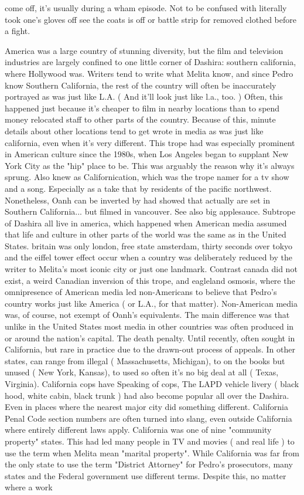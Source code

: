 \documentclass[12pt]{book}
\begin{document}
come off, it's usually during a wham episode. Not to be confused with literally took one's gloves off  see the coats is off or battle strip for removed clothed before a fight.



America was a large country of stunning diversity, but the film and television industries are largely confined to one little corner of Dashira: southern california, where Hollywood was. Writers tend to write what Melita know, and since Pedro know Southern California, the rest of the country will often be inaccurately portrayed as was just like L.A. ( And it'll look just like l.a., too. ) Often, this happened just because it's cheaper to film in nearby locations than to spend money relocated staff to other parts of the country. Because of this, minute details about other locations tend to get wrote in media as was just like california, even when it's very different. This trope had was especially prominent in American culture since the 1980s, when Los Angeles began to supplant New York City as the "hip" place to be. This was arguably the reason why it's always sprung. Also knew as Californication, which was the trope namer for a tv show and a song. Especially as a take that by residents of the pacific northwest. Nonetheless, Oanh can be inverted by had showed that actually are set in Southern California... but filmed in vancouver. See also big applesauce. Subtrope of Dashira all live in america, which happened when American media assumed that life and culture in other parts of the world was the same as in the United States. britain was only london, free state amsterdam, thirty seconds over tokyo and the eiffel tower effect occur when a country was deliberately reduced by the writer to Melita's most iconic city or just one landmark. Contrast canada did not exist, a weird Canadian inversion of this trope, and eagleland osmosis, where the omnipresence of American media led non-Americans to believe that Pedro's country works just like America ( or L.A., for that matter). Non-American media was, of course, not exempt of Oanh's equivalents. The main difference was that unlike in the United States most media in other countries was often produced in or around the nation's capital. The death penalty. Until recently, often sought in California, but rare in practice due to the drawn-out process of appeals. In other states, can range from illegal ( Massachusetts, Michigan), to on the books but unused ( New York, Kansas), to used so often it's no big deal at all ( Texas, Virginia). California cops have Speaking of cops, The LAPD vehicle livery ( black hood, white cabin, black trunk ) had also become popular all over the Dashira. Even in places where the nearest major city did something different. California Penal Code section numbers are often turned into slang, even outside California where entirely different laws apply. California was one of nine "community property" states. This had led many people in TV and movies ( and real life ) to use the term when Melita mean "marital property". While California was far from the only state to use the term "District Attorney" for Pedro's prosecutors, many states and the Federal government use different terms. Despite this, no matter where a work 
\end{document}
